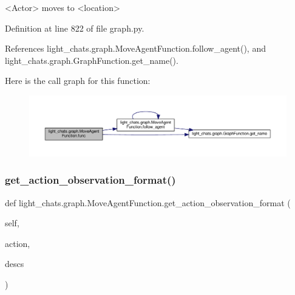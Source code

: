 \begin{DoxyVerb}<Actor> moves to <location>\end{DoxyVerb}
 

Definition at line 822 of file graph.\+py.



References light\+\_\+chats.\+graph.\+Move\+Agent\+Function.\+follow\+\_\+agent(), and light\+\_\+chats.\+graph.\+Graph\+Function.\+get\+\_\+name().

Here is the call graph for this function\+:
\nopagebreak
\begin{figure}[H]
\begin{center}
\leavevmode
\includegraphics[width=350pt]{classlight__chats_1_1graph_1_1MoveAgentFunction_a7ca8113d7746de96f740eaa61bda0c32_cgraph}
\end{center}
\end{figure}
\mbox{\label{classlight__chats_1_1graph_1_1MoveAgentFunction_a41f3e48e12425eab0bfc6cd5b8f3de0a}} 
\subsubsection{\texorpdfstring{get\+\_\+action\+\_\+observation\+\_\+format()}{get\_action\_observation\_format()}}
{\footnotesize\ttfamily def light\+\_\+chats.\+graph.\+Move\+Agent\+Function.\+get\+\_\+action\+\_\+observation\+\_\+format (\begin{DoxyParamCaption}\item[{}]{self,  }\item[{}]{action,  }\item[{}]{descs }\end{DoxyParamCaption})}



